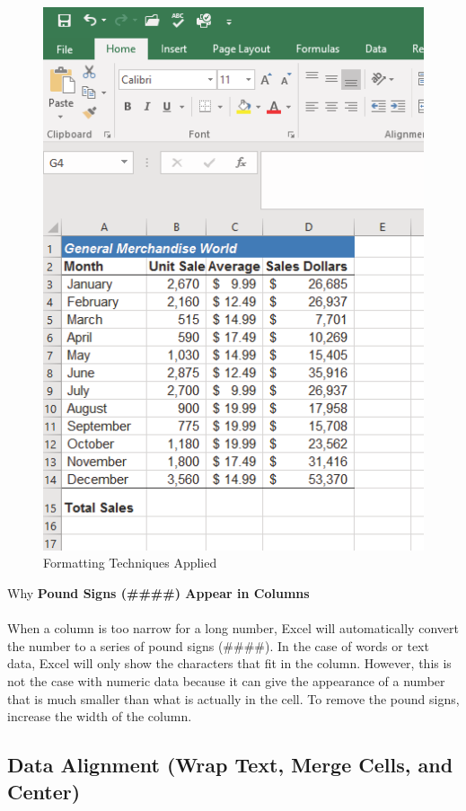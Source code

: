\begin{figure}[H]
	\centering
	\includegraphics[width=\maxwidth{.95\linewidth}]{gfx/ch01_fig37}
	\caption{Formatting Techniques Applied}
	\label{01:fig37}
\end{figure}

\begin{center}
	\begin{infobox}{Why}
		\textbf{Pound Signs (\#\#\#\#) Appear in Columns}
		\\
		\\
		When a column is too narrow for a long number, Excel will automatically convert the number to a series of pound signs (\#\#\#\#). In the case of words or text data, Excel will only show the characters that fit in the column. However, this is not the case with numeric data because it can give the appearance of a number that is much smaller than what is actually in the cell. To remove the pound signs, increase the width of the column.
	\end{infobox}
\end{center}


\subsection{Data Alignment (Wrap Text, Merge Cells, and Center)}


